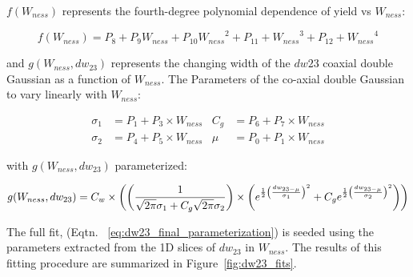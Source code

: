 {\noindent}$f(W_{ness})$ represents the fourth-degree polynomial dependence of
yield vs $W_{ness}$:

\begin{equation} \label{eq:wness_pol4}
  f(W_{ness}) = 
  P_8 + P_9 W_{ness} + 
  P_{10} {W_{ness}}^2 +
  P_{11} + {W_{ness}}^3 +
  P_{12} + {W_{ness}}^4
\end{equation}

{\noindent}and $g(W_{ness},dw_{23})$ represents the changing width of the
$dw{23}$ coaxial double Gaussian as a function of $W_{ness}$. The Parameters of
the co-axial double Gaussian to vary linearly with $W_{ness}$:

\begin{align}\label{eq_dw23_equations}
  \sigma_1 &= P_1 + P_3 \times W_{ness} &  C_g &= P_6 + P_7 \times W_{ness} \\
  \sigma_2 &= P_4 + P_5 \times W_{ness} &  \mu &= P_0 + P_1 \times W_{ness}
\end{align}

{\noindent}with $g(W_{ness},dw_{23})$ parameterized:

\begin{equation}
  g(W_{ness},dw_{23}) = C_w \times 
  \left(
    \left( 
      { {1}\over{\sqrt{2\pi}\sigma_1+C_g\sqrt{2\pi}\sigma_2} }
    \right) 
    \times
    \left(
      e^{{{1}\over{2}}{\left({dw_{23-\mu}}\over{\sigma_1}\right)^2}}
        +C_ge^{{{1}\over{2}}{\left({dw_{23-\mu}}\over{\sigma_2}\right)^2}} 
    \right) 
  \right)
  \label{eq:dw23_parameterization}
\end{equation}

The full fit, (Eqtn. ~\ref{eq:dw23_final_parameterization}) is seeded using the
parameters extracted from the 1D slices of $dw_{23}$ in $W_{ness}$. The results
of this fitting procedure are summarized in Figure~\ref{fig:dw23_fits}.


